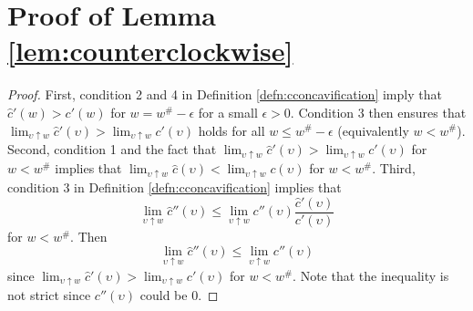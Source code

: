 

\section{Proof of Lemma \ref{lem:counterclockwise}} \label{app:counterclockwise}
\begin{proof} First, condition 2 and 4 in Definition \ref{defn:cconcavification} imply that $\hat{c}'(w) > c'(w)$ for $w = w^{\#} - \epsilon$ for a small $\epsilon > 0$. Condition 3 then ensures that $\lim_{\upsilon \uparrow w} \hat{c}'(\upsilon) > \lim_{\upsilon \uparrow w} c'(\upsilon)$ holds for all $w \leq w^{\#}-\epsilon$ (equivalently $w < w^{\#}$). Second, condition 1 and the fact that $\lim_{\upsilon \uparrow w} \hat{c}'(\upsilon) > \lim_{\upsilon \uparrow w} c'(\upsilon)$ for $w < w^{\#}$ implies that $\lim_{\upsilon \uparrow w} \hat{c}(\upsilon) < \lim_{\upsilon \uparrow w}c(\upsilon)$ for $w < w^{\#}$. Third, condition 3 in Definition \ref{defn:cconcavification} implies that $$\lim_{\upsilon \uparrow w}\hat{c}''(\upsilon) \leq \lim_{\upsilon \uparrow w} c''(\upsilon)\frac{\hat{c}'(\upsilon)}{c'(\upsilon)}$$ for $w < w^{\#}$. Then $$\lim_{\upsilon \uparrow w} \hat{c}''(\upsilon) \leq \lim_{\upsilon \uparrow w} c''(\upsilon)$$ since $\lim_{\upsilon \uparrow w}\hat{c}'(\upsilon) > \lim_{\upsilon \uparrow w} c'(\upsilon)$ for $w < w^{\#}$. Note that the inequality is not strict since $c''(\upsilon)$ could be 0.
\end{proof}




